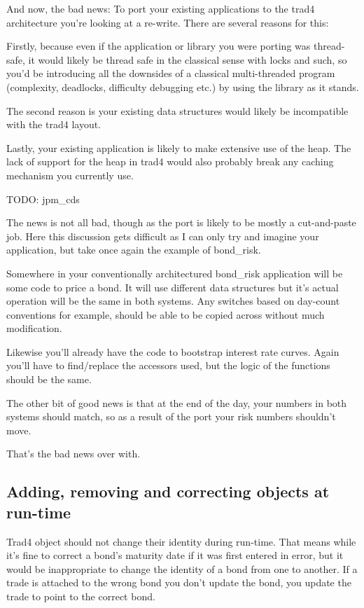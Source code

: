 \documentclass{report}
\begin{document}
And now, the bad news: To port your existing applications to the trad4 architecture you're looking at a re-write. There are several reasons for this:

Firstly, because even if the application or library you were porting was thread-safe, it would likely be thread safe in the classical sense with locks and such, so you'd be introducing all the downsides of a classical multi-threaded program (complexity, deadlocks, difficulty debugging etc.) by using the library as it stands.

The second reason is your existing data structures would likely be incompatible with the trad4 
layout.

Lastly, your existing application is likely to make extensive use of the heap. The lack of support for the heap in trad4 would also probably break any caching mechanism you currently use.

TODO: jpm_cds

The news is not all bad, though as the port is likely to be mostly a cut-and-paste job. Here this discussion gets difficult as I can only try and imagine your application, but take once again the example of bond_risk.

Somewhere in your conventionally architectured bond_risk application will be some code to price a bond. It will use different data structures but it's actual operation will be the same in both systems. Any 
switches based on day-count conventions for example, should be able to be copied across without much modification.

Likewise you'll already have the code to bootstrap interest rate curves. Again you'll have to find/replace the accessors used, but the logic of the functions should be the same.

The other bit of good news is that at the end of the day, your numbers in both systems should match, so as a result of the port your risk numbers shouldn't move.

That's the bad news over with.

\subsection{Adding, removing and correcting objects at run-time}

Trad4 object should not change their identity during run-time. That means while it's fine to correct a bond's maturity date if it was first entered in error, but it would be inappropriate to change the identity of a bond from one to another. If a trade is attached to the wrong bond you don't update the bond, you update the trade to point to the correct bond.
\end{document}
